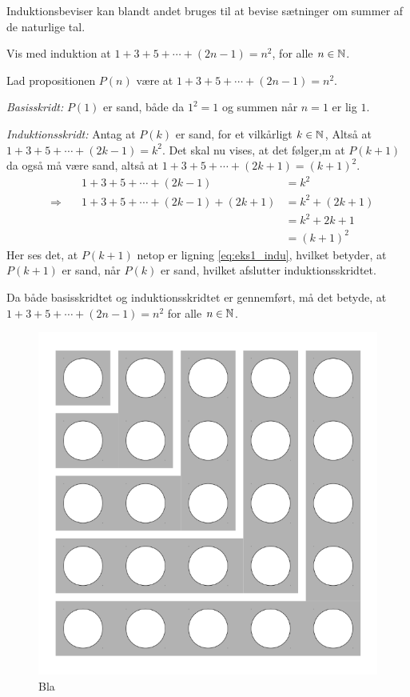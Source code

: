 Induktionsbeviser kan blandt andet bruges til at bevise sætninger om summer af de naturlige tal.
\begin{exmp}
	Vis med induktion at $1 + 3 + 5 + \dotsb + (2n-1) = n^2$, for alle $n \in \mathbb{N}$.

	Lad propositionen $P(n)$ være at $1 + 3 + 5 + \dotsb + (2n-1) = n^2$.
	
	\textit{Basisskridt:} $P(1)$ er sand, både da $1^2 = 1$ og summen når $n = 1$ er lig $1$.

	\textit{Induktionsskridt:} Antag at $P(k)$ er sand, for et vilkårligt $k \in \mathbb{N}$, Altså at $1 + 3 + 5 + \dotsb + (2k-1) = k^2$.
	Det skal nu vises, at det følger,m at $P(k + 1)$ da også må være sand, altså at $1 + 3 + 5 + \dotsb + (2k+1) = \left( k + 1 \right) ^2$.
	\begin{align}
		&&1 + 3 + 5 + \dotsb + (2k-1) 
		&= k^2 \nonumber \\
		&\Rightarrow \quad
		&1 + 3 + 5 + \dotsb + (2k-1) + (2k+1) 
		&= k^2 + (2k + 1) \nonumber \\
		&&&= k^2 + 2k + 1 \nonumber \\
		&&&= \left( k + 1 \right) ^2 \label{eq:eks1_indu}
	\end{align}
	Her ses det, at $P(k + 1)$ netop er ligning \eqref{eq:eks1_indu}, hvilket betyder, at $P(k + 1)$ er sand, når $P(k)$ er sand, hvilket afslutter induktionsskridtet.

	Da både basisskridtet og induktionsskridtet er gennemført, må det betyde, at $1 + 3 + 5 + \dotsb + (2n-1) = n^2$ for alle $n \in \mathbb{N}$.
\end{exmp}

\begin{figure}
	\begin{center}
		\includegraphics[scale=0.2]{fig/img/sum_of_n_first_odd_integers.png}
	\end{center}
	\caption{Bla} \label{fig1_indu}
\end{figure}

